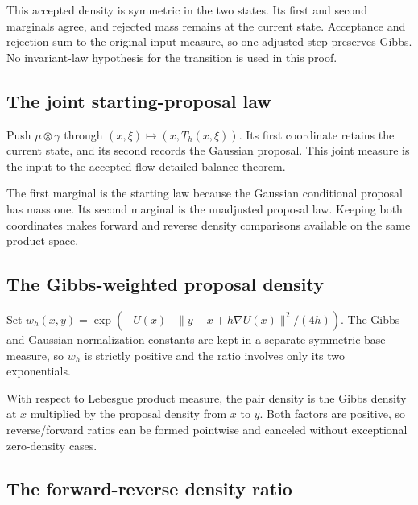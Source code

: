 \documentclass[11pt,a4paper]{report}
\begin{document}
This accepted density is symmetric in the two states. Its first and second marginals agree, and rejected mass remains at the current state. Acceptance and rejection sum to the original input measure, so one adjusted step preserves Gibbs. No invariant-law hypothesis for the transition is used in this proof.

\subsection{\texorpdfstring{The joint starting-proposal law}{The joint starting-proposal law}}
\label{report-step-UnadjustedLangevin-MALAInvariance-lean-1}


Push \(\mu\otimes\gamma\) through \((x,\xi)\mapsto(x,T_h(x,\xi))\). Its first coordinate retains the current state, and its second records the Gaussian proposal. This joint measure is the input to the accepted-flow detailed-balance theorem.



The first marginal is the starting law because the Gaussian conditional proposal has mass one. Its second marginal is the unadjusted proposal law. Keeping both coordinates makes forward and reverse density comparisons available on the same product space.

\subsection{\texorpdfstring{The Gibbs-weighted proposal density}{The Gibbs-weighted proposal density}}
\label{report-step-UnadjustedLangevin-MALAInvariance-lean-2}


Set \(w_h(x,y)=\exp(-U(x)-\|y-x+h\nabla U(x)\|^2/(4h))\). The Gibbs and Gaussian normalization constants are kept in a separate symmetric base measure, so \(w_h\) is strictly positive and the ratio involves only its two exponentials.



With respect to Lebesgue product measure, the pair density is the Gibbs density at \(x\) multiplied by the proposal density from \(x\) to \(y\). Both factors are positive, so reverse/\allowbreak{}forward ratios can be formed pointwise and canceled without exceptional zero-density cases.

\subsection{\texorpdfstring{The forward-reverse density ratio}{The forward-reverse density ratio}}
\label{report-step-UnadjustedLangevin-MALAInvariance-lean-3}
\end{document}
